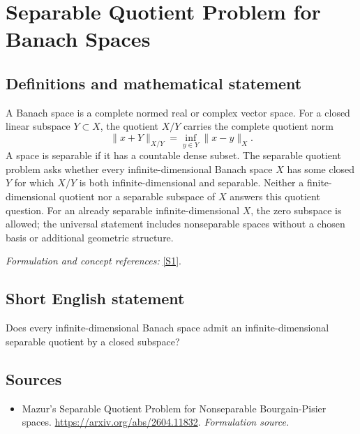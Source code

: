 \documentclass[11pt]{article}
\begin{document}
\section*{\texorpdfstring{Separable Quotient Problem for Banach Spaces}{Separable Quotient Problem for Banach Spaces}}\label{30006911}
\subsection{Definitions and mathematical statement}
A Banach space is a complete normed real or complex vector space. For a closed linear subspace $Y\subset X$, the quotient $X/Y$ carries the complete quotient norm
\[
 \|x+Y\|_{X/Y}=\inf_{y\in Y}\|x-y\|_X.
\]
A space is separable if it has a countable dense subset. The separable quotient problem asks whether every infinite-dimensional Banach space $X$ has some closed $Y$ for which $X/Y$ is both infinite-dimensional and separable. Neither a finite-dimensional quotient nor a separable subspace of $X$ answers this quotient question. For an already separable infinite-dimensional $X$, the zero subspace is allowed; the universal statement includes nonseparable spaces without a chosen basis or additional geometric structure.
\par\smallskip\textit{Formulation and concept references:} \href{https://arxiv.org/abs/2604.11832}{[S1]}.

\subsection{Short English statement}
Does every infinite-dimensional Banach space admit an infinite-dimensional separable quotient by a closed subspace?
\subsection{Sources}
\begin{itemize}
\item[S1]Mazur's Separable Quotient Problem for Nonseparable Bourgain-Pisier spaces.
\url{https://arxiv.org/abs/2604.11832}.
\textit{Formulation source.}
\end{itemize}
\end{document}
